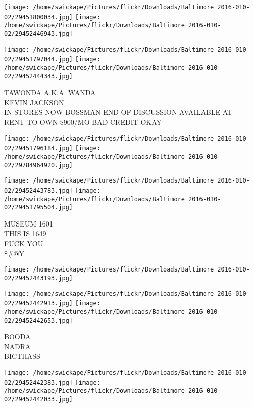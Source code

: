 \documentclass[10pt,letterpaper]{article}
\begin{document}
\texttt{[image: /home/swickape/Pictures/flickr/Downloads/Baltimore 2016-010-02/29451800034.jpg]}
\texttt{[image: /home/swickape/Pictures/flickr/Downloads/Baltimore 2016-010-02/29452446943.jpg]}

\texttt{[image: /home/swickape/Pictures/flickr/Downloads/Baltimore 2016-010-02/29451797044.jpg]}
\texttt{[image: /home/swickape/Pictures/flickr/Downloads/Baltimore 2016-010-02/29452444343.jpg]}

TAWONDA A.K.A. WANDA\\
KEVIN JACKSON\\
IN STORES NOW BOSSMAN END OF DISCUSSION AVAILABLE AT\\
RENT TO OWN \$900/MO BAD CREDIT OKAY\\
\pagebreak

\texttt{[image: /home/swickape/Pictures/flickr/Downloads/Baltimore 2016-010-02/29451796184.jpg]}
\texttt{[image: /home/swickape/Pictures/flickr/Downloads/Baltimore 2016-010-02/29784964920.jpg]}

\texttt{[image: /home/swickape/Pictures/flickr/Downloads/Baltimore 2016-010-02/29452443783.jpg]}
\texttt{[image: /home/swickape/Pictures/flickr/Downloads/Baltimore 2016-010-02/29451795504.jpg]}

MUSEUM 1601\\
THIS IS 1649\\
FUCK YOU\\
\$\#@¥\\
\pagebreak

\texttt{[image: /home/swickape/Pictures/flickr/Downloads/Baltimore 2016-010-02/29452443193.jpg]}

\vspace{0.25in}
\texttt{[image: /home/swickape/Pictures/flickr/Downloads/Baltimore 2016-010-02/29452442913.jpg]}
\texttt{[image: /home/swickape/Pictures/flickr/Downloads/Baltimore 2016-010-02/29452442653.jpg]}

BOODA\\
NADRA\\
BICTHASS\\
\pagebreak

\texttt{[image: /home/swickape/Pictures/flickr/Downloads/Baltimore 2016-010-02/29452442383.jpg]}
\texttt{[image: /home/swickape/Pictures/flickr/Downloads/Baltimore 2016-010-02/29452442033.jpg]}
\end{document}
